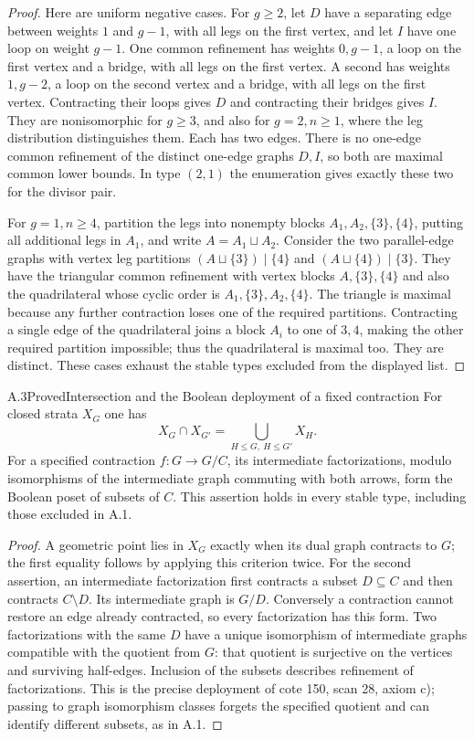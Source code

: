 \begin{proof}
Here are uniform negative cases. For $g\geq2$, let $D$ have a separating edge between weights $1$ and $g-1$, with all legs on the first vertex, and let $I$ have one loop on weight $g-1$. One common refinement has weights $0,g-1$, a loop on the first vertex and a bridge, with all legs on the first vertex. A second has weights $1,g-2$, a loop on the second vertex and a bridge, with all legs on the first vertex. Contracting their loops gives $D$ and contracting their bridges gives $I$. They are nonisomorphic for $g\geq3$, and also for $g=2,n\geq1$, where the leg distribution distinguishes them. Each has two edges. There is no one-edge common refinement of the distinct one-edge graphs $D,I$, so both are maximal common lower bounds. In type $(2,1)$ the enumeration gives exactly these two for the divisor pair.

For $g=1,n\geq4$, partition the legs into nonempty blocks $A_1,A_2,\{3\},\{4\}$, putting all additional legs in $A_1$, and write $A=A_1\sqcup A_2$. Consider the two parallel-edge graphs with vertex leg partitions $(A\sqcup\{3\})\mid\{4\}$ and $(A\sqcup\{4\})\mid\{3\}$. They have the triangular common refinement with vertex blocks $A,\{3\},\{4\}$ and also the quadrilateral whose cyclic order is $A_1,\{3\},A_2,\{4\}$. The triangle is maximal because any further contraction loses one of the required partitions. Contracting a single edge of the quadrilateral joins a block $A_i$ to one of $3,4$, making the other required partition impossible; thus the quadrilateral is maximal too. They are distinct. These cases exhaust the stable types excluded from the displayed list.
\end{proof}

\begin{result}{A.3}{Proved}{Intersection and the Boolean deployment of a fixed contraction}
For closed strata $X_G$ one has
\[
 X_G\cap X_{G'}=\bigcup_{H\leq G,\ H\leq G'}X_H.
\]
For a specified contraction $f:G\to G/C$, its intermediate factorizations, modulo isomorphisms of the intermediate graph commuting with both arrows, form the Boolean poset of subsets of $C$. This assertion holds in every stable type, including those excluded in A.1.
\end{result}
\begin{proof}
A geometric point lies in $X_G$ exactly when its dual graph contracts to $G$; the first equality follows by applying this criterion twice. For the second assertion, an intermediate factorization first contracts a subset $D\subseteq C$ and then contracts $C\setminus D$. Its intermediate graph is $G/D$. Conversely a contraction cannot restore an edge already contracted, so every factorization has this form. Two factorizations with the same $D$ have a unique isomorphism of intermediate graphs compatible with the quotient from $G$: that quotient is surjective on the vertices and surviving half-edges. Inclusion of the subsets describes refinement of factorizations. This is the precise deployment of cote 150, scan 28, axiom c); passing to graph isomorphism classes forgets the specified quotient and can identify different subsets, as in A.1.
\end{proof}

